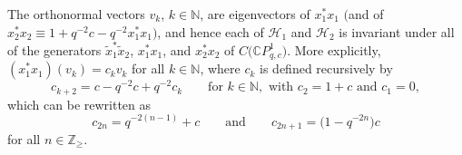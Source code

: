 \begin{proposition}\label{recursive} The orthonormal vectors $v_{k}$, $k\in\mathbb{N}$, are
eigenvectors of $x_{1}^{\ast}x_{1}$ $($and of $x_{2}^{\ast}x_{2}\equiv
1+q^{-2}c-q^{-2}x_{1}^{\ast}x_{1})$, and hence each of $\mathcal{H}_{1}$ and
$\mathcal{H}_{2}$ is invariant under all of the generators $\tilde{x}
_{1}^{\ast}\tilde{x}_{2}$, $x_{1}^{\ast}x_{1}$, and $x_{2}^{\ast}x_{2}$ of
$C\big(\mathbb{C}P_{q,c}^{1}\big) $. More explicitly, $(x_{1}^{\ast}x_{1}) ( v_{k}) =c_{k}v_{k}$ for all
$k\in\mathbb{N}$, where $c_{k}$ is defined recursively by
\[
c_{k+2}=c-q^{-2}c+q^{-2}c_{k}\qquad \text{for }k\in\mathbb{N},\text{\ with\ } c_{2}=1+c\text{\ and }c_{1}=0,
\]
which can be rewritten as
\[
c_{2n}=q^{-2( n-1) }+c\qquad \text{and} \qquad c_{2n+1}=\big(1-q^{-2n}\big) c
\]
for all $n\in\mathbb{Z}_{\geq}$.
\end{proposition}

